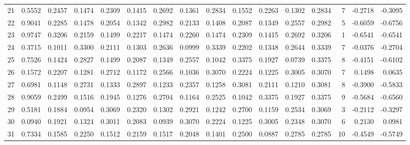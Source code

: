 \begin{tabular}{lrrrrrrrrrrrrrrr}
21  &      0.5552 &  0.2457 &  0.1474 &  0.2309 &  0.1415 &  0.2692 &  0.1361 &  0.2834 &  0.1552 &  0.2263 &   0.1302 &     0.2834 &      7 &                   -0.2718 &                    -0.3095 \\
22  &      0.9041 &  0.2285 &  0.1478 &  0.2054 &  0.1342 &  0.2982 &  0.2133 &  0.1408 &  0.2087 &  0.1349 &   0.2557 &     0.2982 &      5 &                   -0.6059 &                    -0.6756 \\
23  &      0.9747 &  0.3206 &  0.2159 &  0.1499 &  0.2217 &  0.1474 &  0.2260 &  0.1474 &  0.2309 &  0.1415 &   0.2692 &     0.3206 &      1 &                   -0.6541 &                    -0.6541 \\
24  &      0.3715 &  0.1011 &  0.3300 &  0.2111 &  0.1303 &  0.2636 &  0.0999 &  0.3339 &  0.2202 &  0.1348 &   0.2644 &     0.3339 &      7 &                   -0.0376 &                    -0.2704 \\
25  &      0.7526 &  0.1424 &  0.2827 &  0.1499 &  0.2087 &  0.1349 &  0.2557 &  0.1042 &  0.3375 &  0.1927 &   0.0739 &     0.3375 &      8 &                   -0.4151 &                    -0.6102 \\
26  &      0.1572 &  0.2207 &  0.1281 &  0.2712 &  0.1172 &  0.2566 &  0.1036 &  0.3070 &  0.2224 &  0.1225 &   0.3005 &     0.3070 &      7 &                    0.1498 &                     0.0635 \\
27  &      0.6981 &  0.1148 &  0.2731 &  0.1333 &  0.2897 &  0.1233 &  0.2357 &  0.1258 &  0.3081 &  0.2111 &   0.1210 &     0.3081 &      8 &                   -0.3900 &                    -0.5833 \\
28  &      0.9059 &  0.2499 &  0.1516 &  0.1945 &  0.1276 &  0.2704 &  0.1164 &  0.2525 &  0.1042 &  0.3375 &   0.1927 &     0.3375 &      9 &                   -0.5684 &                    -0.6560 \\
29  &      0.5181 &  0.1884 &  0.0954 &  0.3069 &  0.2320 &  0.1302 &  0.2921 &  0.1242 &  0.2700 &  0.1159 &   0.2534 &     0.3069 &      3 &                   -0.2112 &                    -0.3297 \\
30  &      0.0940 &  0.1921 &  0.1324 &  0.3011 &  0.2083 &  0.0939 &  0.3070 &  0.2224 &  0.1225 &  0.3005 &   0.2348 &     0.3070 &      6 &                    0.2130 &                     0.0981 \\
31  &      0.7334 &  0.1585 &  0.2250 &  0.1512 &  0.2159 &  0.1517 &  0.2048 &  0.1401 &  0.2500 &  0.0887 &   0.2785 &     0.2785 &     10 &                   -0.4549 &                    -0.5749 \\

\end{tabular}
